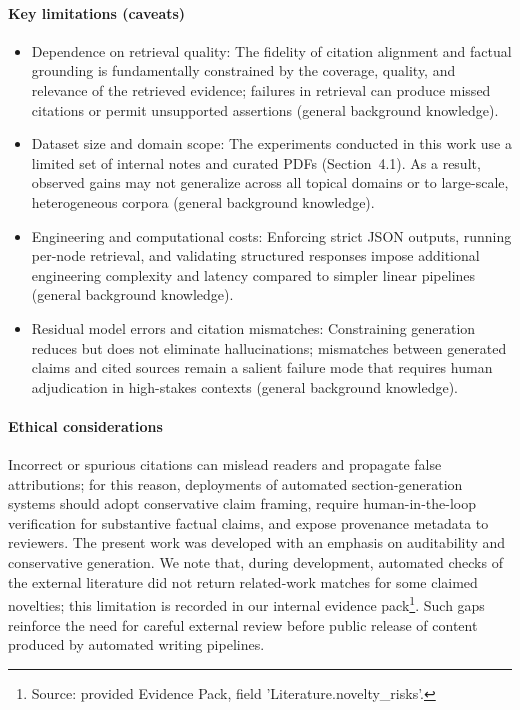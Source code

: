 \paragraph{Key limitations (caveats)}
\begin{itemize}
  \item Dependence on retrieval quality: The fidelity of citation alignment and factual grounding is fundamentally constrained by the coverage, quality, and relevance of the retrieved evidence; failures in retrieval can produce missed citations or permit unsupported assertions (general background knowledge).
  \item Dataset size and domain scope: The experiments conducted in this work use a limited set of internal notes and curated PDFs (Section~4.1). As a result, observed gains may not generalize across all topical domains or to large-scale, heterogeneous corpora (general background knowledge).
  \item Engineering and computational costs: Enforcing strict JSON outputs, running per-node retrieval, and validating structured responses impose additional engineering complexity and latency compared to simpler linear pipelines (general background knowledge).
  \item Residual model errors and citation mismatches: Constraining generation reduces but does not eliminate hallucinations; mismatches between generated claims and cited sources remain a salient failure mode that requires human adjudication in high-stakes contexts (general background knowledge).
\end{itemize}

\paragraph{Ethical considerations}
Incorrect or spurious citations can mislead readers and propagate false attributions; for this reason, deployments of automated section-generation systems should adopt conservative claim framing, require human-in-the-loop verification for substantive factual claims, and expose provenance metadata to reviewers. The present work was developed with an emphasis on auditability and conservative generation. We note that, during development, automated checks of the external literature did not return related-work matches for some claimed novelties; this limitation is recorded in our internal evidence pack\footnote{Source: provided Evidence Pack, field 'Literature.novelty_risks'.}. Such gaps reinforce the need for careful external review before public release of content produced by automated writing pipelines.

